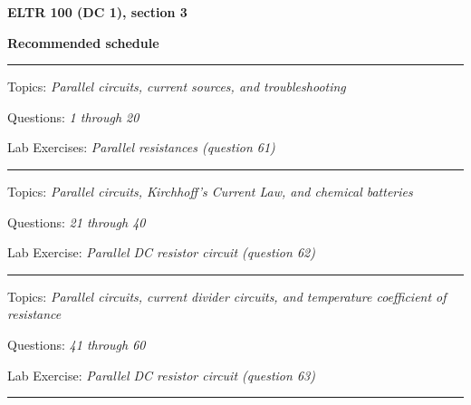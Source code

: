 
\centerline{\bf ELTR 100 (DC 1), section 3} \bigskip 
 
\vskip 10pt

\noindent
{\bf Recommended schedule}

\vskip 5pt

\hrule \vskip 5pt
\noindent
{}

\hskip 10pt Topics: {\it Parallel circuits, current sources, and troubleshooting}
 
\hskip 10pt Questions: {\it 1 through 20}
 
\hskip 10pt Lab Exercises: {\it Parallel resistances (question 61)}
 

\vskip 10pt
\hrule \vskip 5pt
\noindent
{}

\hskip 10pt Topics: {\it Parallel circuits, Kirchhoff's Current Law, and chemical batteries}
 
\hskip 10pt Questions: {\it 21 through 40}
 
\hskip 10pt Lab Exercise: {\it Parallel DC resistor circuit (question 62)}
 




\vskip 10pt
\hrule \vskip 5pt
\noindent
{}

\hskip 10pt Topics: {\it Parallel circuits, current divider circuits, and temperature coefficient of resistance}
 
\hskip 10pt Questions: {\it 41 through 60}
 
\hskip 10pt Lab Exercise: {\it Parallel DC resistor circuit (question 63)}
 

\vskip 10pt
\hrule \vskip 5pt
\noindent
{}

